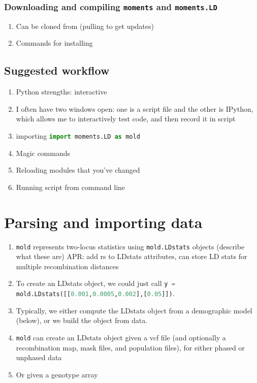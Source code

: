 \documentclass[11pt]{article}
\makeatletter
\newcommand{\comment}[1]{{\color{blue}APR: #1}}
\newcommand{\mold}{\texttt{mold}\xspace}
\newcommand{\py}[1]{\lstinline[breaklines=true,language=Python, showstringspaces=False]@#1@}
\makeatother
\begin{document}
\subsubsection{Downloading and compiling \texttt{moments} and \texttt{moments.LD}}

\begin{enumerate}
\item Can be cloned from \url{} (pulling to get updates)
\item Commands for installing
\end{enumerate}

\subsection{Suggested workflow}
\begin{enumerate}
\item Python strengths: interactive
\item I often have two windows open: one is a script file and the other is IPython, which allows me to interactively test code, and then record it in script
\item importing \py{import moments.LD as mold}
\item Magic commands
\item Reloading modules that you've changed
\item Running script from command line
\end{enumerate}


\section{Parsing and importing data}

\begin{enumerate}
\item \mold represents two-locus statistics using \py{mold.LDstats} objects (describe what these are) \comment{add rs to LDstats attributes, can store LD stats for multiple recombination distances}
\item To create an LDstats object, we could just call \py{y = mold.LDstats([[0.001,0.0005,0.002],[0.05]])}.
\item Typically, we either compute the LDstats object from a demographic model (below), or we build the object from data.
\item \mold can create an LDstats object given a vcf file (and optionally a recombination map, mask files, and population files), for either phased or unphased data
\item Or given a genotype array
\end{enumerate}
\end{document}
